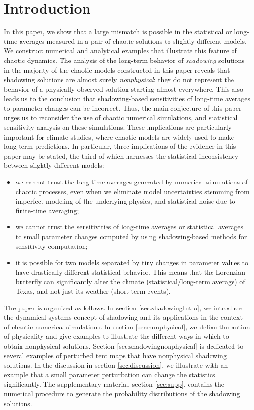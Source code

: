 \section{Introduction}
In this paper, we show that a large mismatch is possible in the statistical or long-time averages measured in a pair of chaotic solutions to slightly different models. We construct numerical and analytical examples that illustrate this feature of chaotic dynamics. The analysis of the long-term behavior of {\em shadowing} solutions in the majority of the chaotic models constructed in this paper reveals that shadowing solutions are almost surely {\em nonphysical}: they do not represent the behavior of a physically observed solution starting almost everywhere. This also leads us to the conclusion that shadowing-based sensitivities \cite{qiqi-lss} of long-time averages to parameter changes can be incorrect. Thus, the main conjecture of this paper urges us to reconsider the use of chaotic numerical simulations, and statistical sensitivity analysis on these simulations. These implications are particularly important for climate studies, where chaotic models are widely used to make long-term predictions. In particular, three implications of the evidence in this paper may be stated, the third of which harnesses the statistical inconsistency between slightly different models:
\begin{itemize}
    \item we cannot trust the long-time averages generated by numerical simulations of chaotic processes, even when we eliminate model uncertainties stemming from imperfect modeling of the underlying physics, and statistical noise due to finite-time averaging;
    \item we cannot trust the sensitivities of long-time averages or statistical averages to small parameter changes computed by using shadowing-based methods for sensitivity computation;
    \item it is possible for two models separated by tiny changes in parameter values to have drastically different statistical behavior. This means that the Lorenzian butterfly can significantly alter the climate (statistical/long-term average) of Texas, and not just its weather (short-term events).
\end{itemize}
The paper is organized as follows. In section \ref{sec:shadowingIntro}, we introduce the dynamical systems concept of shadowing and its applications in the context of chaotic numerical simulations. In section \ref{sec:nonphysical}, we define the notion of physicality and give examples to illustrate the different ways in which to obtain nonphysical solutions. Section \ref{sec:shadowingnonphysical} is dedicated to several examples of perturbed tent maps that have nonphysical shadowing solutions. In the discussion in section \ref{sec:discussion}, we illustrate with an example that a small parameter perturbation can change the statistics significantly. The supplementary material, section \ref{sec:supp}, contains the numerical procedure to generate the probability distributions of the shadowing solutions.

